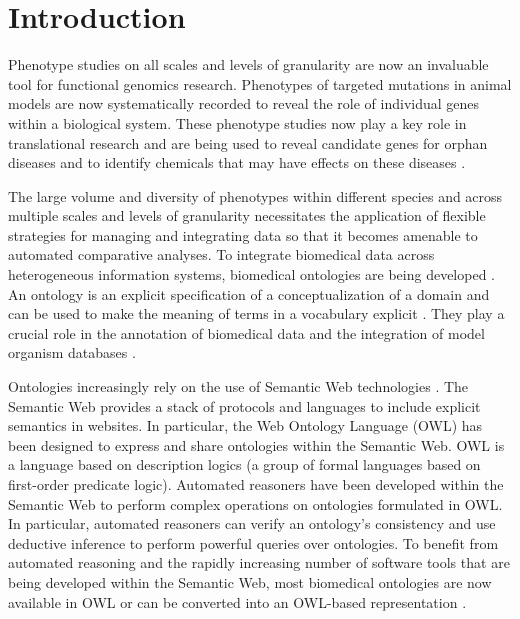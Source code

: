 \documentclass{bioinfo}
\renewcommand{\cite}{\citep}
\providecommand{\DIFaddbegin}{} %
\providecommand{\DIFaddend}{} %
\providecommand{\DIFdelbegin}{} %
\providecommand{\DIFdelend}{} %
\begin{document}
\section{Introduction}
Phenotype studies on all scales and levels of granularity are now an
invaluable tool for functional genomics research. Phenotypes of
targeted mutations in animal models are now systematically recorded to
reveal the role of individual genes within a biological system. These
phenotype studies now play a key role in translational research and
are being used to reveal candidate genes for orphan diseases and to
identify chemicals that may have effects on these diseases
\cite{Schofield2011}.

The large volume and diversity of phenotypes within different species
and across multiple scales and levels of granularity necessitates the
application of flexible strategies for managing and integrating data
so that it becomes amenable to automated comparative analyses. To
integrate biomedical data across heterogeneous information systems,
biomedical ontologies are being developed \DIFdelbegin %
\DIFdelend \DIFaddbegin \cite{Smith2007short}\DIFaddend . An
ontology is an explicit specification of a conceptualization of a
domain and can be used to make the meaning of terms in a vocabulary
explicit \cite{Gruber1995, Guarino1998}. They play a crucial role in
the annotation of biomedical data and the integration of model
organism databases \cite{go2010, Bada2004, goble}.

Ontologies increasingly rely on the use of Semantic Web technologies
\cite{Berners-Lee2001}. The Semantic Web provides a stack of protocols
and languages to include explicit semantics in websites. In
particular, the Web Ontology Language (OWL) \cite{Grau2008} has been
designed to express and share ontologies within the Semantic Web. OWL
is a language based on description logics (a group of formal languages
based on first-order predicate logic). Automated reasoners have been
developed within the Semantic Web to perform complex operations on
ontologies formulated in OWL. In particular, automated reasoners can
verify an ontology's consistency and use deductive inference to
perform powerful queries over ontologies. To benefit from automated
reasoning and the rapidly increasing number of software tools that are
being developed within the Semantic Web, most biomedical ontologies
are now available in OWL or can be converted into an OWL-based
representation \cite{Horrocks2007, Hoehndorf2010patterns}.
\end{document}
